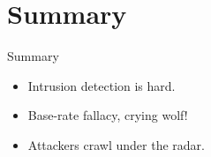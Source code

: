 \section{Summary}

\begin{frame}
  \begin{block}{Summary}
    \begin{itemize}
      \item Intrusion detection is hard.
      \item Base-rate fallacy, crying wolf!
      \item Attackers crawl under the radar.
    \end{itemize}
  \end{block}
\end{frame}
